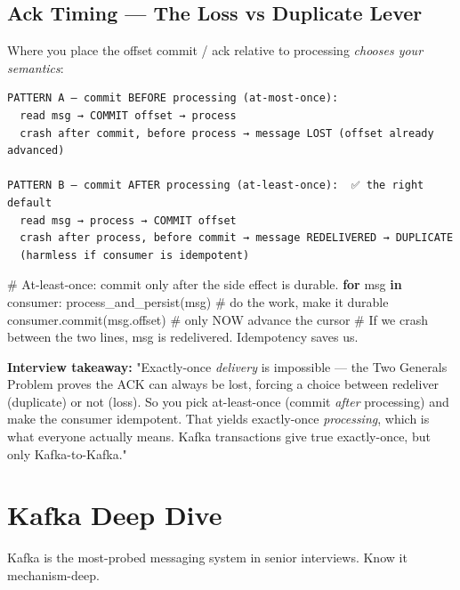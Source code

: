 \documentclass[11pt]{article}
\newenvironment{Shaded}{\begin{snugshade}}{\end{snugshade}}
\newcommand{\CommentTok}[1]{\textcolor[rgb]{0.48,0.49,0.49}{#1}}
\newcommand{\ControlFlowTok}[1]{\textcolor[rgb]{0.99,0.74,0.29}{\textbf{#1}}}
\newcommand{\KeywordTok}[1]{\textcolor[rgb]{0.81,0.81,0.76}{\textbf{#1}}}
\newcommand{\NormalTok}[1]{\textcolor[rgb]{0.81,0.81,0.76}{#1}}
\begin{document}
\subsection{Ack Timing --- The Loss vs Duplicate Lever}\label{ack-timing--the-loss-vs-duplicate-lever}

Where you place the offset commit / ack relative to processing \emph{chooses your semantics}:

\setcodelang{}

\begin{verbatim}
PATTERN A — commit BEFORE processing (at-most-once):
  read msg → COMMIT offset → process
  crash after commit, before process → message LOST (offset already advanced)

PATTERN B — commit AFTER processing (at-least-once):  ✅ the right default
  read msg → process → COMMIT offset
  crash after process, before commit → message REDELIVERED → DUPLICATE
  (harmless if consumer is idempotent)
\end{verbatim}


\begin{Shaded}
\begin{Highlighting}[]
\CommentTok{\# At{-}least{-}once: commit only after the side effect is durable.}
\ControlFlowTok{for}\NormalTok{ msg }\KeywordTok{in}\NormalTok{ consumer:}
\NormalTok{    process\_and\_persist(msg)     }\CommentTok{\# do the work, make it durable}
\NormalTok{    consumer.commit(msg.offset)  }\CommentTok{\# only NOW advance the cursor}
    \CommentTok{\# If we crash between the two lines, msg is redelivered. Idempotency saves us.}
\end{Highlighting}
\end{Shaded}

\textbf{Interview takeaway:} "Exactly-once \emph{delivery} is impossible --- the Two Generals Problem proves the ACK can always be lost, forcing a choice between redeliver (duplicate) or not (loss). So you pick at-least-once (commit \emph{after} processing) and make the consumer idempotent. That yields exactly-once \emph{processing}, which is what everyone actually means. Kafka transactions give true exactly-once, but only Kafka-to-Kafka."

\section{Kafka Deep Dive}\label{kafka-deep-dive}

Kafka is the most-probed messaging system in senior interviews. Know it mechanism-deep.
\end{document}

